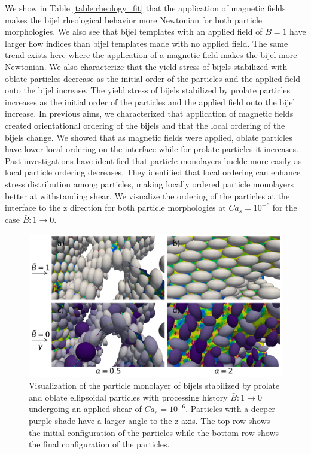 We show in Table \ref{table:rheology_fit} that the application of magnetic fields makes the bijel rheological behavior more Newtonian for both particle 
morphologies. We also see that bijel templates with an applied field of $\bar{B} = 1$ have larger flow indices than bijel templates made with no
applied field. The same trend exists here where the application of a magnetic field makes the bijel more Newtonian. We also characterize that the yield stress 
of bijels stabilized with oblate particles decrease as the initial order of the particles and the applied field onto the bijel increase. The yield stress of 
bijels stabilized by prolate particles increases as the initial order of the particles and the applied field onto the bijel increase. In previous aims, we 
characterized that application of magnetic fields created orientational ordering of the bijels and that the local ordering of the bijels change. We 
showed that as magnetic fields were applied, oblate particles have lower local ordering on the interface while for prolate particles it increases.
Past investigations have identified that particle monolayers buckle more easily as local particle ordering decreases. \cite{prakash_buckling_2024} 
They identified that local ordering can enhance stress distribution among particles, making locally ordered particle monolayers better at withstanding shear.
We visualize the ordering of the particles at the interface to the z direction for both particle morphologies at $Ca_s = 10^{-6}$ for the 
case $\bar{B}: 1 \rightarrow 0$.

\begin{figure} 
    \centering 
    \includegraphics[scale=0.4]{../figures/results/paper3/tz_concat_startB-1_endB-0.png} 
    \caption{Visualization of the particle monolayer of bijels stabilized by prolate and oblate ellipsoidal particles with processing history $\bar{B}: 1 \rightarrow 0$
             undergoing an applied shear of $Ca_s = 10^{-6}$. Particles with a deeper purple shade have a larger angle to the z axis. The top row shows the initial 
             configuration of the particles while the bottom row shows the final configuration of the particles. } 
    \label{fig:particle_viz_tz} 
\end{figure}

